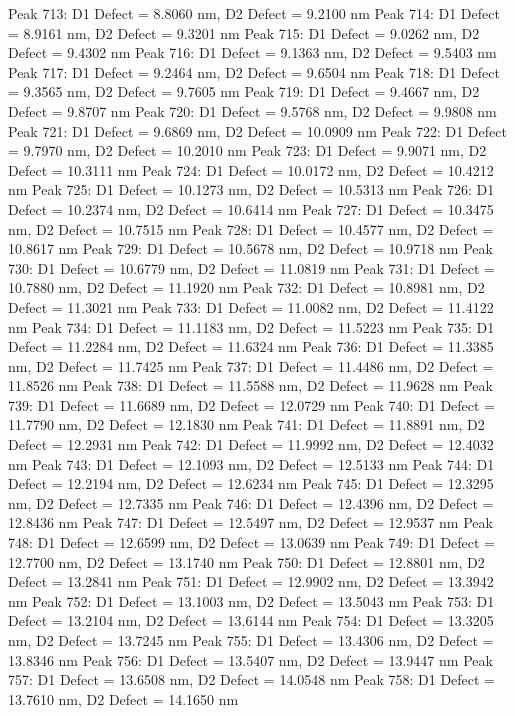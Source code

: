 \documentclass{article}
\begin{document}
Peak 713: D1 Defect = 8.8060 nm, D2 Defect = 9.2100 nm
Peak 714: D1 Defect = 8.9161 nm, D2 Defect = 9.3201 nm
Peak 715: D1 Defect = 9.0262 nm, D2 Defect = 9.4302 nm
Peak 716: D1 Defect = 9.1363 nm, D2 Defect = 9.5403 nm
Peak 717: D1 Defect = 9.2464 nm, D2 Defect = 9.6504 nm
Peak 718: D1 Defect = 9.3565 nm, D2 Defect = 9.7605 nm
Peak 719: D1 Defect = 9.4667 nm, D2 Defect = 9.8707 nm
Peak 720: D1 Defect = 9.5768 nm, D2 Defect = 9.9808 nm
Peak 721: D1 Defect = 9.6869 nm, D2 Defect = 10.0909 nm
Peak 722: D1 Defect = 9.7970 nm, D2 Defect = 10.2010 nm
Peak 723: D1 Defect = 9.9071 nm, D2 Defect = 10.3111 nm
Peak 724: D1 Defect = 10.0172 nm, D2 Defect = 10.4212 nm
Peak 725: D1 Defect = 10.1273 nm, D2 Defect = 10.5313 nm
Peak 726: D1 Defect = 10.2374 nm, D2 Defect = 10.6414 nm
Peak 727: D1 Defect = 10.3475 nm, D2 Defect = 10.7515 nm
Peak 728: D1 Defect = 10.4577 nm, D2 Defect = 10.8617 nm
Peak 729: D1 Defect = 10.5678 nm, D2 Defect = 10.9718 nm
Peak 730: D1 Defect = 10.6779 nm, D2 Defect = 11.0819 nm
Peak 731: D1 Defect = 10.7880 nm, D2 Defect = 11.1920 nm
Peak 732: D1 Defect = 10.8981 nm, D2 Defect = 11.3021 nm
Peak 733: D1 Defect = 11.0082 nm, D2 Defect = 11.4122 nm
Peak 734: D1 Defect = 11.1183 nm, D2 Defect = 11.5223 nm
Peak 735: D1 Defect = 11.2284 nm, D2 Defect = 11.6324 nm
Peak 736: D1 Defect = 11.3385 nm, D2 Defect = 11.7425 nm
Peak 737: D1 Defect = 11.4486 nm, D2 Defect = 11.8526 nm
Peak 738: D1 Defect = 11.5588 nm, D2 Defect = 11.9628 nm
Peak 739: D1 Defect = 11.6689 nm, D2 Defect = 12.0729 nm
Peak 740: D1 Defect = 11.7790 nm, D2 Defect = 12.1830 nm
Peak 741: D1 Defect = 11.8891 nm, D2 Defect = 12.2931 nm
Peak 742: D1 Defect = 11.9992 nm, D2 Defect = 12.4032 nm
Peak 743: D1 Defect = 12.1093 nm, D2 Defect = 12.5133 nm
Peak 744: D1 Defect = 12.2194 nm, D2 Defect = 12.6234 nm
Peak 745: D1 Defect = 12.3295 nm, D2 Defect = 12.7335 nm
Peak 746: D1 Defect = 12.4396 nm, D2 Defect = 12.8436 nm
Peak 747: D1 Defect = 12.5497 nm, D2 Defect = 12.9537 nm
Peak 748: D1 Defect = 12.6599 nm, D2 Defect = 13.0639 nm
Peak 749: D1 Defect = 12.7700 nm, D2 Defect = 13.1740 nm
Peak 750: D1 Defect = 12.8801 nm, D2 Defect = 13.2841 nm
Peak 751: D1 Defect = 12.9902 nm, D2 Defect = 13.3942 nm
Peak 752: D1 Defect = 13.1003 nm, D2 Defect = 13.5043 nm
Peak 753: D1 Defect = 13.2104 nm, D2 Defect = 13.6144 nm
Peak 754: D1 Defect = 13.3205 nm, D2 Defect = 13.7245 nm
Peak 755: D1 Defect = 13.4306 nm, D2 Defect = 13.8346 nm
Peak 756: D1 Defect = 13.5407 nm, D2 Defect = 13.9447 nm
Peak 757: D1 Defect = 13.6508 nm, D2 Defect = 14.0548 nm
Peak 758: D1 Defect = 13.7610 nm, D2 Defect = 14.1650 nm
\end{document}
